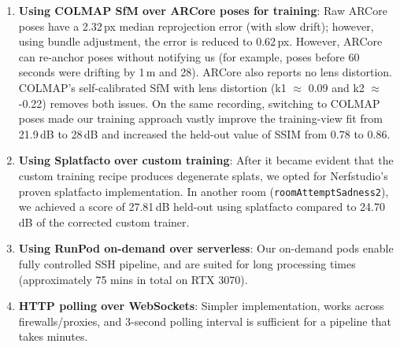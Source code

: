 \begin{enumerate}
    \item \textbf{Using COLMAP SfM over ARCore poses for training}: Raw ARCore poses have a 2.32\,px median reprojection error (with slow drift); however, using bundle adjustment, the error is reduced to 0.62\,px. However, ARCore can re-anchor poses without notifying us (for example, poses before 60 seconds were drifting by 1\,m and 28\textdegree{}). ARCore also reports no lens distortion. COLMAP's self-calibrated SfM with lens distortion (k1 $\approx$ 0.09 and k2 $\approx$ -0.22) removes both issues. On the same recording, switching to COLMAP poses made our training approach vastly improve the training-view fit from 21.9\,dB to 28\,dB and increased the held-out value of SSIM from 0.78 to 0.86.

    \item \textbf{Using Splatfacto over custom training}: After it became evident that the custom training recipe produces degenerate splats, we opted for Nerfstudio's proven splatfacto implementation. In another room (\texttt{roomAttemptSadness2}), we achieved a score of 27.81\,dB held-out using splatfacto compared to 24.70\,dB of the corrected custom trainer.

    \item \textbf{Using RunPod on-demand over serverless}: Our on-demand pods enable fully controlled SSH pipeline, and are suited for long processing times (approximately 75 mins in total on RTX 3070).

    \item \textbf{HTTP polling over WebSockets}: Simpler implementation, works across firewalls/proxies, and 3-second polling interval is sufficient for a pipeline that takes minutes.
\end{enumerate}

